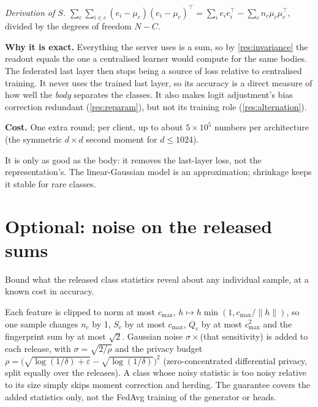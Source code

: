 \documentclass[11pt]{article}
\theoremstyle{plain}
\theoremstyle{definition}
\newcommand{\norm}[1]{\lVert #1\rVert}
\begin{document}
\emph{Derivation of $S$.} $\sum_c\sum_{i\in c}(e_i-\mu_c)(e_i-\mu_c)^\top=\sum_ie_ie_i^\top-\sum_cn_c\mu_c\mu_c^\top$,
divided by the degrees of freedom $N-C$.

\textbf{Why it is exact.} Everything the server uses is a sum, so by \cref{res:invariance} the readout equals the one a
centralised learner would compute for the same bodies. The federated last layer then stops being a source of loss
relative to centralised training. It never uses the trained last layer, so its accuracy is a direct measure of how well
the \emph{body} separates the classes. It also makes logit adjustment's bias correction redundant (\cref{res:reparam}),
but not its training role (\cref{res:alternation}).

\textbf{Cost.} One extra round; per client, up to about $5\times10^5$ numbers per architecture (the symmetric $d\times d$
second moment for $d\le1024$).

\begin{caveat}
It is only as good as the body: it removes the last-layer loss, not the representation's. The linear-Gaussian model is
an approximation; shrinkage keeps it stable for rare classes.
\end{caveat}

\section{Optional: noise on the released sums}\label{sec:privacy}

\begin{purpose}
Bound what the released class statistics reveal about any individual sample, at a known cost in accuracy.
\end{purpose}

Each feature is clipped to norm at most $c_{\max}$, $h\mapsto h\min(1,c_{\max}/\norm h)$, so one sample changes $n_c$ by
1, $S_c$ by at most $c_{\max}$, $Q_c$ by at most $c_{\max}^2$ and the fingerprint sum by at most $\sqrt2$. Gaussian noise
$\sigma\times$(that sensitivity) is added to each release, with $\sigma=\sqrt{2/\rho}$ and the privacy budget
$\rho=\big(\sqrt{\log(1/\delta)+\varepsilon}-\sqrt{\log(1/\delta)}\big)^2$ (zero-concentrated differential privacy, split
equally over the releases). A class whose noisy statistic is too noisy relative to its size simply skips moment
correction and herding. The guarantee covers the added statistics only, not the FedAvg training of the generator or
heads.
\end{document}
